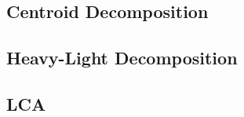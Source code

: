 \subsection{Centroid Decomposition}
\raggedbottom
\hrulefill
\subsection{Heavy-Light Decomposition}
\raggedbottom
\hrulefill
\subsection{LCA}
\raggedbottom
\hrulefill

